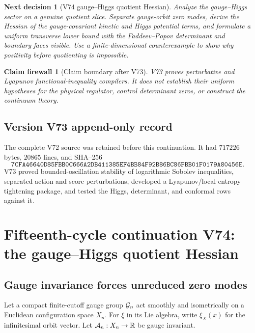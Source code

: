 \documentclass[11pt]{article}
\newtheorem{firewall}[theorem]{Claim firewall}
\newtheorem{decision}[theorem]{Next decision}
\theoremstyle{remark}
\begin{document}
\begin{decision}[V74 gauge--Higgs quotient Hessian]
\label{dec:v15v73-next}
Analyze the gauge--Higgs sector on a genuine quotient slice.
Separate gauge-orbit zero modes, derive the Hessian of the
gauge-covariant kinetic and Higgs potential terms, and formulate a
uniform transverse lower bound with the Faddeev--Popov determinant
and boundary faces visible.  Use a finite-dimensional counterexample
to show why positivity before quotienting is impossible.
\end{decision}

\begin{firewall}[Claim boundary after V73]
\label{fire:v15v73}
V73 proves perturbative and Lyapunov functional-inequality
compilers.  It does not establish their uniform hypotheses for the
physical regulator, control determinant zeros, or construct the
continuum theory.
\end{firewall}

\section*{Version V73 append-only record}
The complete V72 source was retained before this continuation.  It
had \(717226\) bytes, \(20865\) lines, and SHA--256
\[
 \texttt{7CFA46640D85FBB0C666A2DB411385EF4BB84F92B86BC86FBB01F0179A80456E}.
\]
V73 proved bounded-oscillation stability of logarithmic Sobolev
inequalities, separated action and score perturbations, developed
a Lyapunov/local-entropy tightening package, and tested the Higgs,
determinant, and conformal rows against it.

\chapter{Fifteenth-cycle continuation V74: the gauge--Higgs quotient Hessian}
\label{sec:v15v74}

\section{Gauge invariance forces unreduced zero modes}

Let a compact finite-cutoff gauge group \({\cal G}_n\) act smoothly
and isometrically on a Euclidean configuration space \(X_n\).
For \(\xi\) in its Lie algebra, write
\(\xi_X(x)\) for the infinitesimal orbit vector.  Let
\({\cal A}_n:X_n\to{\mathbb R}\) be gauge invariant.
\end{document}
